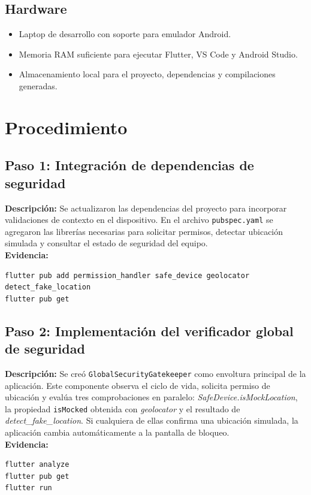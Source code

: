 \documentclass[12pt, a4paper]{article}
\begin{document}
\subsection*{Hardware}
\begin{itemize}[topsep=4pt]
    \item Laptop de desarrollo con soporte para emulador Android.
    \item Memoria RAM suficiente para ejecutar Flutter, VS Code y Android Studio.
    \item Almacenamiento local para el proyecto, dependencias y compilaciones generadas.
\end{itemize}

\section{Procedimiento}

\subsection*{Paso 1: Integración de dependencias de seguridad}
\textbf{Descripción:} Se actualizaron las dependencias del proyecto para incorporar validaciones de contexto en el dispositivo. En el archivo \texttt{pubspec.yaml} se agregaron las librerías necesarias para solicitar permisos, detectar ubicación simulada y consultar el estado de seguridad del equipo.\\[4pt]
\textbf{Evidencia:}
\begin{lstlisting}[caption={Comandos ejecutados en el Paso 1}]
flutter pub add permission_handler safe_device geolocator detect_fake_location
flutter pub get
\end{lstlisting}

\subsection*{Paso 2: Implementación del verificador global de seguridad}
\textbf{Descripción:} Se creó \texttt{GlobalSecurityGatekeeper} como envoltura principal de la aplicación. Este componente observa el ciclo de vida, solicita permiso de ubicación y evalúa tres comprobaciones en paralelo: \textit{SafeDevice.isMockLocation}, la propiedad \texttt{isMocked} obtenida con \textit{geolocator} y el resultado de \textit{detect\_fake\_location}. Si cualquiera de ellas confirma una ubicación simulada, la aplicación cambia automáticamente a la pantalla de bloqueo.\\[4pt]
\textbf{Evidencia:}
\begin{lstlisting}[caption={Comandos ejecutados en el Paso 2}]
flutter analyze
flutter pub get
flutter run
\end{lstlisting}
\end{document}

